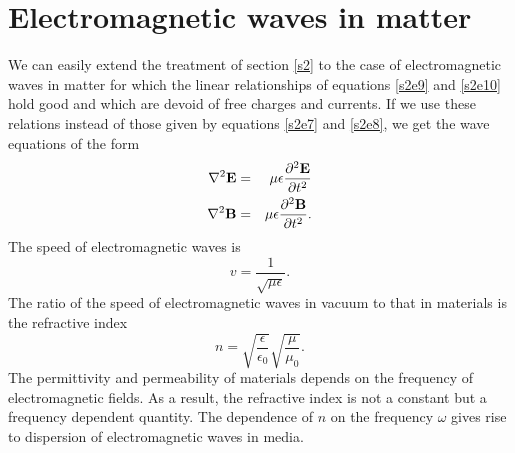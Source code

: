 \documentclass[11pt]{article}
\numberwithin{equation}{section}
\begin{document}
\section{Electromagnetic waves in matter}\label{s4}
We can easily extend the treatment of section \ref{s2} to the case of 
electromagnetic waves in matter for which the linear relationships of
equations \eqref{s2e9} and \eqref{s2e10} hold good and which are devoid of 
free charges and currents. If we use these relations instead of those given 
by equations \eqref{s2e7} and \eqref{s2e8}, we get the wave equations of the 
form
\begin{eqnarray}
\laplacian\vb{E} &=& \mu\epsilon\pdv[2]{\vb{E}}{t} \label{s4e1} \\
\laplacian\vb{B} &=& \mu\epsilon\pdv[2]{\vb{B}}{t}. \label{s4e2}
\end{eqnarray}
The speed of electromagnetic waves is 
\begin{equation}\label{s4e3}
v = \frac{1}{\sqrt{\mu\epsilon}}.
\end{equation}
The ratio of the speed of electromagnetic waves in vacuum to that in materials
is the refractive index
\begin{equation}\label{s4e4}
n = \sqrt{\frac{\epsilon}{\epsilon_0}}\sqrt{\frac{\mu}{\mu_0}}.
\end{equation}
The permittivity and permeability of materials depends on the frequency of
electromagnetic fields. As a result, the refractive index is not a constant
but a frequency dependent quantity. The dependence of $n$ on the frequency
$\omega$ gives rise to dispersion of electromagnetic waves in media.
\end{document}
